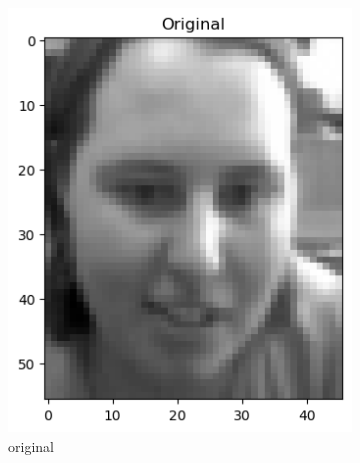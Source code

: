 \begin{figure}
	\centering
	\begin{subfigure}[t]{0.2\linewidth}
		\centering
		\includegraphics[width=\linewidth]{image/q1_recon_train_original.png}
		\caption{original}
		\label{fig:train_re_original}
	\end{subfigure}%
	\hfill
	\begin{subfigure}[t]{0.2\linewidth}
		\centering

\end{subfigure}
\end{figure}
